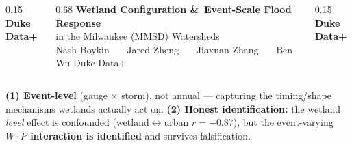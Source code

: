 \documentclass[final]{beamer}
\begin{document}
\begin{frame}[t]

\begin{columns}
\begin{column}{0.15\paperwidth}\centering
  {\color{dukenavy}\bfseries\fontsize{46}{52}\selectfont Duke}\\[2pt]
  {\color{accent}\bfseries\fontsize{46}{52}\selectfont Data+}\end{column}
\begin{column}{0.68\paperwidth}\centering
  {\color{dukenavy}\bfseries\fontsize{60}{66}\selectfont Wetland Configuration \&\ Event-Scale Flood Response}\\[6pt]
  {\color{dukeblue}\fontsize{38}{44}\selectfont in the Milwaukee (MMSD) Watersheds}\\[10pt]
  {\fontsize{28}{34}\selectfont Nash Boykin \ \textbullet\ \ Jared Zheng \ \textbullet\ \ Jiaxuan Zhang \ \textbullet\ \ Ben Wu \quad\textbar\quad Duke Data+}\end{column}
\begin{column}{0.15\paperwidth}\centering
  {\color{dukenavy}\bfseries\fontsize{46}{52}\selectfont Duke}\\[2pt]
  {\color{accent}\bfseries\fontsize{46}{52}\selectfont Data+}\end{column}
\end{columns}
\vskip6pt
\begin{beamercolorbox}[wd=\paperwidth,sep=10pt]{}\colorbox{dukenavy}{\parbox{0.985\paperwidth}{\centering\color{white}\large
\textbf{(1) Event-level} (gauge $\times$ storm), not annual --- capturing the timing/shape mechanisms wetlands actually act on. \quad\textbullet\quad
\textbf{(2) Honest identification:} the wetland \emph{level} effect is confounded (wetland$\leftrightarrow$urban $r=-0.87$), but the event-varying \textbf{$W\!\cdot\!P$ interaction is identified} and survives falsification.}}\end{beamercolorbox}
\vskip8pt

\begin{columns}[t]


\end{columns}
\end{frame}
\end{document}
